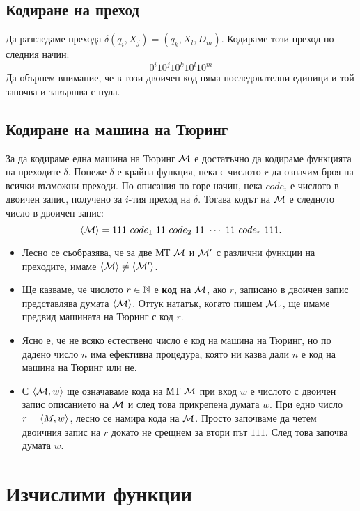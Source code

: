 \subsection*{Кодиране на преход}
Да разгледаме прехода $\delta(q_i,X_j) = (q_k,X_l,D_m)$.
Кодираме този преход по следния начин:
\[0^i10^j10^k10^l10^m\]
Да обърнем внимание, че в този двоичен код няма последователни единици и той 
започва и завършва с нула.
\subsection*{Кодиране на машина на Тюринг}
За да кодираме една машина на Тюринг $\mathcal{M}$ е достатъчно да кодираме функцията на преходите $\delta$.
Понеже $\delta$ е крайна функция, нека с числото $r$ да означим броя на всички възможни преходи.
По описания по-горе начин, нека $code_i$ е числото в двоичен запис, получено за $i$-тия преход на $\delta$.
Тогава кодът на $\mathcal{M}$ е следното число в двоичен запис:
\[\pair{\M} = 111\ code_1\ 11\ code_2\ 11\ \cdots\ 11\ code_r\ 111.\]
\begin{itemize}
\item
  Лесно се съобразява, че за две МТ $\mathcal{M}$ и $\mathcal{M}'$ с различни функции на преходите, имаме $\langle{\mathcal{M}}\rangle \neq \langle{\mathcal{M}'}\rangle$.
\item
  Ще казваме, че числото $r\in\mathbb{N}$ е {\bf код на} $\mathcal{M}$, ако $r$, записано в двоичен запис представлява думата $\langle{\mathcal{M}}\rangle$.
  Оттук нататък, когато пишем $\mathcal{M}_r$, ще имаме предвид машината на Тюринг с код $r$.
\item
  Ясно е, че не всяко естествено число е код на машина на Тюринг, но по дадено число $n$
  има ефективна процедура, която ни казва дали $n$ е код на машина на Тюринг или не.
\item
  С $\langle{\mathcal{M},w}\rangle$ ще означаваме кода на МТ $\mathcal{M}$ при вход $w$ е числото с двоичен запис описанието на $\mathcal{M}$ и след това прикрепена думата $w$.
  При едно число $r = \langle{M,w}\rangle$, лесно се намира кода на $\mathcal{M}$.
  Просто започваме да четем двоичния запис на $r$ докато не срещнем за втори път $111$.
  След това започва думата $w$.
\end{itemize}


\section{Изчислими функции}


